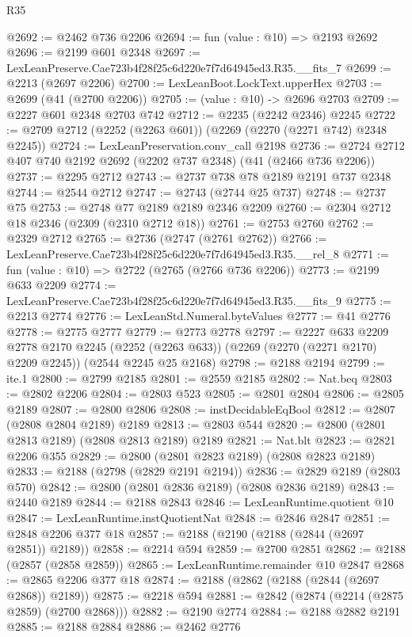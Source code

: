 \begin{lexlean}{R35}
\begin{coremodule}
@2692 := @2462 @736 @2206
@2694 := fun (value : @10) => @2193 @2692
@2696 := @2199 @601 @2348
@2697 := LexLeanPreserve.Cae723b4f28f25c6d220e7f7d64945ed3.R35.__fits_7
@2699 := @2213 (@2697 @2206)
@2700 := LexLeanBoot.LockText.upperHex
@2703 := @2699 (@41 (@2700 @2206))
@2705 := (value : @10) -> @2696 @2703
@2709 := @2227 @601 @2348 @2703 @742
@2712 := @2235 (@2242 @2346) @2245
@2722 := @2709 @2712 (@2252 (@2263 @601)) (@2269 (@2270 (@2271 @742) @2348 @2245))
@2724 := LexLeanPreservation.conv_call @2198
@2736 := @2724 @2712 @407 @740 @2192 @2692 (@2202 @737 @2348) (@41 (@2466 @736 @2206))
@2737 := @2295 @2712
@2743 := @2737 @738 @78 @2189 @2191 @737 @2348
@2744 := @2544 @2712
@2747 := @2743 (@2744 @25 @737)
@2748 := @2737 @75
@2753 := @2748 @77 @2189 @2189 @2346 @2209
@2760 := @2304 @2712 @18 @2346 (@2309 (@2310 @2712 @18))
@2761 := @2753 @2760
@2762 := @2329 @2712
@2765 := @2736 (@2747 (@2761 @2762))
@2766 := LexLeanPreserve.Cae723b4f28f25c6d220e7f7d64945ed3.R35.__rel_8
@2771 := fun (value : @10) => @2722 (@2765 (@2766 @736 @2206))
@2773 := @2199 @633 @2209
@2774 := LexLeanPreserve.Cae723b4f28f25c6d220e7f7d64945ed3.R35.__fits_9
@2775 := @2213 @2774
@2776 := LexLeanStd.Numeral.byteValues
@2777 := @41 @2776
@2778 := @2775 @2777
@2779 := @2773 @2778
@2797 := @2227
    @633
    @2209
    @2778
    @2170
    @2245
    (@2252 (@2263 @633))
    (@2269 (@2270 (@2271 @2170) @2209 @2245))
    (@2544 @2245 @25 @2168)
@2798 := @2188 @2194
@2799 := ite.{1}
@2800 := @2799 @2185
@2801 := @2559 @2185
@2802 := Nat.beq
@2803 := @2802 @2206
@2804 := @2803 @523
@2805 := @2801 @2804
@2806 := @2805 @2189
@2807 := @2800 @2806
@2808 := instDecidableEqBool
@2812 := @2807 (@2808 @2804 @2189) @2189
@2813 := @2803 @544
@2820 := @2800 (@2801 @2813 @2189) (@2808 @2813 @2189) @2189
@2821 := Nat.blt
@2823 := @2821 @2206 @355
@2829 := @2800 (@2801 @2823 @2189) (@2808 @2823 @2189)
@2833 := @2188 (@2798 (@2829 @2191 @2194))
@2836 := @2829 @2189 (@2803 @570)
@2842 := @2800 (@2801 @2836 @2189) (@2808 @2836 @2189)
@2843 := @2440 @2189
@2844 := @2188 @2843
@2846 := LexLeanRuntime.quotient @10
@2847 := LexLeanRuntime.instQuotientNat
@2848 := @2846 @2847
@2851 := @2848 @2206 @377 @18
@2857 := @2188 (@2190 (@2188 (@2844 (@2697 @2851)) @2189))
@2858 := @2214 @594
@2859 := @2700 @2851
@2862 := @2188 (@2857 (@2858 @2859))
@2865 := LexLeanRuntime.remainder @10 @2847
@2868 := @2865 @2206 @377 @18
@2874 := @2188 (@2862 (@2188 (@2844 (@2697 @2868)) @2189))
@2875 := @2218 @594
@2881 := @2842 (@2874 (@2214 (@2875 @2859) (@2700 @2868)))
@2882 := @2190 @2774
@2884 := @2188 @2882 @2191
@2885 := @2188 @2884
@2886 := @2462 @2776

\end{coremodule}
\end{lexlean}
